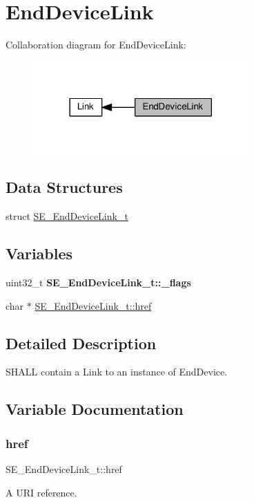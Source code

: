 \hypertarget{group__EndDeviceLink}{}\section{End\+Device\+Link}
\label{group__EndDeviceLink}
Collaboration diagram for End\+Device\+Link\+:\nopagebreak
\begin{figure}[H]
\begin{center}
\leavevmode
\includegraphics[width=234pt]{group__EndDeviceLink}
\end{center}
\end{figure}
\subsection*{Data Structures}
\begin{DoxyCompactItemize}
\item 
struct \hyperlink{structSE__EndDeviceLink__t}{S\+E\+\_\+\+End\+Device\+Link\+\_\+t}
\end{DoxyCompactItemize}
\subsection*{Variables}
\begin{DoxyCompactItemize}
\item 
\mbox{\label{group__EndDeviceLink_ga6a31618d4a0686308b79c18602ba59c2}} 
uint32\+\_\+t {\bfseries S\+E\+\_\+\+End\+Device\+Link\+\_\+t\+::\+\_\+flags}
\item 
char $\ast$ \hyperlink{group__EndDeviceLink_gad00b1df34c0c7fdac7997e4da43de6e7}{S\+E\+\_\+\+End\+Device\+Link\+\_\+t\+::href}
\end{DoxyCompactItemize}


\subsection{Detailed Description}
S\+H\+A\+LL contain a Link to an instance of End\+Device. 

\subsection{Variable Documentation}
\mbox{\label{group__EndDeviceLink_gad00b1df34c0c7fdac7997e4da43de6e7}} 
\subsubsection{\texorpdfstring{href}{href}}
{\footnotesize\ttfamily S\+E\+\_\+\+End\+Device\+Link\+\_\+t\+::href}

A U\+RI reference. 
